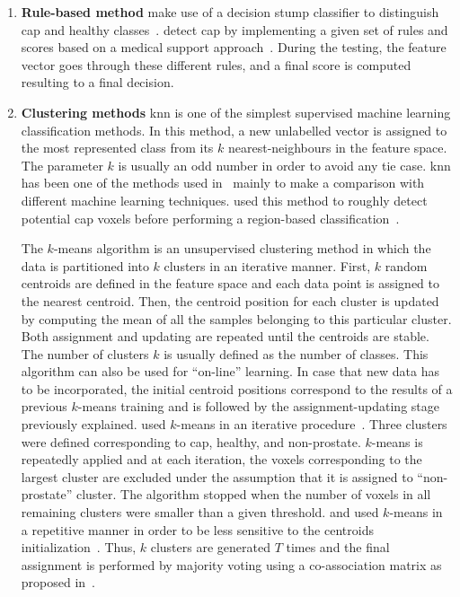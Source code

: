 \begin{enumerate}[leftmargin=*]

\item[] \textbf{Rule-based method}
  \citeauthor{Lv2009} make use of a decision stump classifier to distinguish
  \ac{cap} and healthy classes~\cite{Lv2009}.
  \citeauthor{Puech2009} detect \ac{cap} by implementing a given set of rules and
  scores based on a medical support approach~\cite{Puech2009}.
  During the testing, the feature vector goes through these different rules, and
  a final score is computed resulting to a final decision.

\item[] \textbf{Clustering methods}
  \acf{knn} is one of the simplest supervised machine learning classification
  methods.
  In this method, a new unlabelled vector is assigned to the most represented
  class from its $k$ nearest-neighbours in the feature space.
  The parameter $k$ is usually an odd number in order to avoid any tie case.
  \ac{knn} has been one of the methods used
  in~\cite{Niaf2011,Niaf2012,rampun2016computerb} mainly to make a comparison
  with different machine learning techniques.
  \citeauthor{Litjens2012} used this method to roughly detect potential \ac{cap}
  voxels before performing a region-based classification~\cite{Litjens2012}.

  The $k$-means algorithm is an unsupervised clustering method in which the data
  is partitioned into $k$ clusters in an iterative manner.
  First, $k$ random centroids are defined in the feature space and each data
  point is assigned to the nearest centroid.
  Then, the centroid position for each cluster is updated by computing the mean
  of all the samples belonging to this particular cluster.
  Both assignment and updating are repeated until the centroids are stable.
  The number of clusters $k$ is usually defined as the number of classes.
  This algorithm can also be used for ``on-line'' learning.
  In case that new data has to be incorporated, the initial centroid positions
  correspond to the results of a previous $k$-means training and is followed by
  the assignment-updating stage previously explained.
  \citeauthor{Tiwari2009} used $k$-means in an iterative
  procedure~\cite{Tiwari2007,Tiwari2009}.
  Three clusters were defined corresponding to \ac{cap}, healthy, and
  non-prostate.
  $k$-means is repeatedly applied and at each iteration, the voxels
  corresponding to the largest cluster are excluded under the assumption that
  it is assigned to ``non-prostate'' cluster.
  The algorithm stopped when the number of voxels in all remaining clusters
  were smaller than a given threshold.
  \citeauthor{Tiwari2008} and \citeauthor{Viswanath2008a} used $k$-means in a
  repetitive manner in order to be less sensitive to the centroids
  initialization~\cite{Viswanath2008,Viswanath2008a,Tiwari2008}.
  Thus, $k$ clusters are generated $T$ times and the final assignment is
  performed by majority voting using a co-association matrix as proposed
  in~\cite{Fred2005}.


\end{enumerate}
